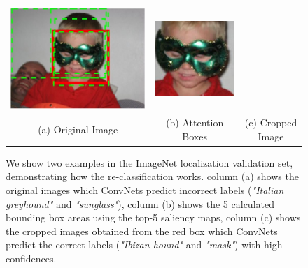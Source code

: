 \begin{figure}[htb]
\begin{center}
\begin{tabular}{ccc}
\includegraphics[width=0.31\linewidth,height=0.31\linewidth]{figs/re-classification/boundingbox/ILSVRC2012_val_00000608} &
\includegraphics[width=0.31\linewidth,height=0.31\linewidth]{figs/re-classification/crop_image/ILSVRC2012_val_00000608} \\
{\small (a) Original Image} &
{\small (b) Attention Boxes} &
{\small (c) Cropped Image} \\
\end{tabular}
\caption{We show two examples in the ImageNet localization validation set, demonstrating how the re-classification works. column (a) shows the original images which ConvNets predict incorrect labels ({\em "Italian greyhound"} and {\em "sunglass"}), column (b) shows the 5 calculated bounding box areas using the top-5 saliency maps, column (c) shows the cropped images obtained from the red box which ConvNets predict the correct labels ({\em "Ibizan hound"} and {\em "mask"}) with high confidences.}

\label{fig:reclassification_examples}
\end{center}
\end{figure}



